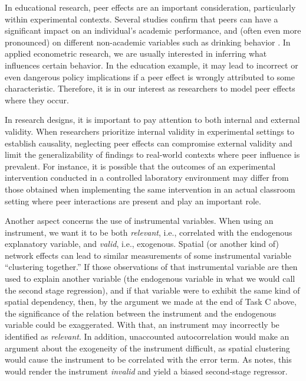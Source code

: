 \documentclass[
  a4paper,
]{article}
\begin{document}
In educational research, peer effects are an important consideration,
particularly within experimental contexts. Several studies confirm that
peers can have a significant impact on an individual's academic
performance, and (often even more pronounced) on different non-academic
variables such as drinking behavior \parencite{sacerdote2011}. In
applied econometric research, we are usually interested in inferring
what influences certain behavior. In the education example, it may lead
to incorrect or even dangerous policy implications if a peer effect is
wrongly attributed to some characteristic. Therefore, it is in our
interest as researchers to model peer effects where they occur.

In research designs, it is important to pay attention to both internal
and external validity. When researchers prioritize internal validity in
experimental settings to establish causality, neglecting peer effects
can compromise external validity and limit the generalizability of
findings to real-world contexts where peer influence is prevalent. For
instance, it is possible that the outcomes of an experimental
intervention conducted in a controlled laboratory environment may differ
from those obtained when implementing the same intervention in an actual
classroom setting where peer interactions are present and play an
important role.

Another aspect concerns the use of instrumental variables. When using an
instrument, we want it to be both \emph{relevant}, i.e., correlated with
the endogenous explanatory variable, and \emph{valid}, i.e., exogenous.
Spatial (or another kind of) network effects can lead to similar
measurements of some instrumental variable ``clustering together.'' If
those observations of that instrumental variable are then used to
explain another variable (the endogenous variable in what we would call
the second stage regression), and if that variable were to exhibit the
same kind of spatial dependency, then, by the argument we made at the
end of Task C above, the significance of the relation between the
instrument and the endogenous variable could be exaggerated. With that,
an instrument may incorrectly be identified as \emph{relevant}. In
addition, unaccounted autocorrelation would make an argument about the
exogeneity of the instrument difficult, as spatial clustering would
cause the instrument to be correlated with the error term. As
\textcite{betz2020} notes, this would render the instrument
\emph{invalid} and yield a biased second-stage regressor.
\end{document}
